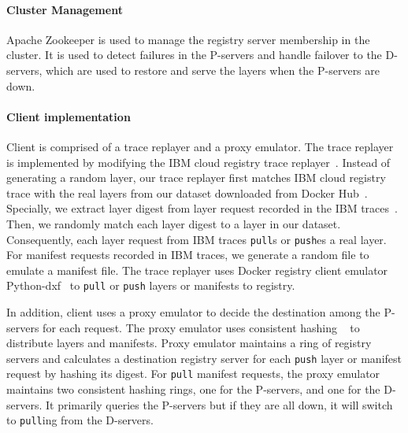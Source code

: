 \paragraph{Cluster Management}

Apache Zookeeper is used to manage the registry server membership in the cluster. It is used to detect failures in the P-servers and handle failover to the D-servers, which are used to restore and serve the layers when the P-servers are down.

\paragraph{Client implementation}
Client is comprised of a trace replayer and 
a proxy emulator.
The trace replayer is implemented by modifying the IBM cloud registry trace replayer~\cite{dockerworkload}.
Instead of generating a random layer,
our trace replayer first matches IBM cloud registry trace with 
the real layers from our dataset downloaded from Docker Hub~\cite{dedupanalysis}.
Specially, we extract layer digest from layer request recorded in the IBM traces~\cite{dockerworkload}.
Then, 
we randomly match each layer digest to a layer in our dataset. 
Consequently, each layer request from IBM traces \texttt{pull}s or \texttt{push}es a real layer.
For manifest requests recorded in IBM traces, we generate a random file to emulate a manifest file.
The trace replayer uses Docker registry client emulator Python-dxf~\cite{pydxf} to 
\texttt{pull} or \texttt{push} layers or manifests to registry.

In addition, client uses a proxy emulator to decide the destination among the P-servers for each request.
The proxy emulator uses
consistent hashing ~\cite{kargercons} to distribute layers and manifests.
Proxy emulator maintains a ring of registry servers
and calculates a destination registry server for each \texttt{push} layer or manifest request
 by hashing its digest. For \texttt{pull} manifest requests, the proxy emulator maintains two consistent hashing rings, one for the P-servers, and one for the D-servers. It primarily queries the P-servers but if they are all down, it will switch to \texttt{pull}ing from the D-servers.

